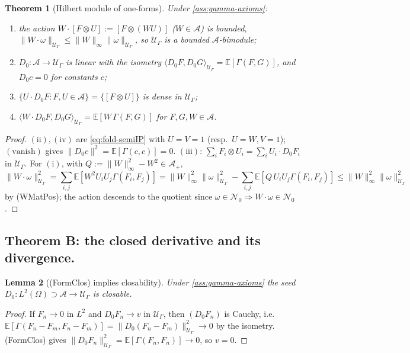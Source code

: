 \documentclass[reqno,final,11pt]{amsart}
\theoremstyle{plain}
\newtheorem{theorem}{Theorem}[section]
\newtheorem{lemma}[theorem]{Lemma}
\theoremstyle{definition}
\theoremstyle{remark}
\newcommand{\E}{\mathbb E}
\newcommand{\cA}{\mathcal A}
\newcommand{\cU}{\mathcal U}
\begin{document}
\begin{theorem}[Hilbert module of one-forms]\label{thm:foldA}
Under \cref{ass:gamma-axioms}:
\begin{enumerate}
\item[$(\mathrm i)$] the action $W\cdot[F\otimes U]:=[F\otimes(WU)]$ ($W\in\cA$)
is bounded, $\|W\cdot\omega\|_{\cU_\Gamma}\le\|W\|_\infty\|\omega\|_{\cU_\Gamma}$,
so $\cU_\Gamma$ is a bounded $\cA$-bimodule;
\item[$(\mathrm{ii})$] $D_0\colon\cA\to\cU_\Gamma$ is linear with the isometry
$\langle D_0F,D_0G\rangle_{\cU_\Gamma}=\E[\Gamma(F,G)]$, and $D_0c=0$ for
constants $c$;
\item[$(\mathrm{iii})$] $\{U\cdot D_0F:F,U\in\cA\}=\{[F\otimes U]\}$ is dense in
$\cU_\Gamma$;
\item[$(\mathrm{iv})$] $\langle W\cdot D_0F,D_0G\rangle_{\cU_\Gamma}
=\E[W\,\Gamma(F,G)]$ for $F,G,W\in\cA$.
\end{enumerate}
\end{theorem}
\begin{proof}
$(\mathrm{ii}),(\mathrm{iv})$ are \eqref{eq:fold-semiIP} with $U=V=1$
(resp.\ $U=W,V=1$); $(\mathrm{vanish})$ gives $\|D_0c\|^2=\E[\Gamma(c,c)]=0$.
$(\mathrm{iii})$: $\sum_iF_i\otimes U_i=\sum_iU_i\cdot D_0F_i$ in $\cU_\Gamma$.
For $(\mathrm i)$, with $Q:=\|W\|_\infty^2-W^2\in\cA_+$,
\[
  \|W\cdot\omega\|^2_{\cU_\Gamma}
  =\sum_{i,j}\E[W^2U_iU_j\Gamma(F_i,F_j)]
  =\|W\|_\infty^2\|\omega\|^2_{\cU_\Gamma}-\sum_{i,j}\E[Q\,U_iU_j\Gamma(F_i,F_j)]
  \le\|W\|_\infty^2\|\omega\|^2_{\cU_\Gamma}
\]
by \textnormal{(WMatPos)}; the action descends to the quotient since
$\omega\in\mathcal N_0\Rightarrow W\cdot\omega\in\mathcal N_0$.
\end{proof}

\subsection*{Theorem B: the closed derivative and its divergence.}
\begin{lemma}[\textnormal{(FormClos)} implies closability]\label{lem:foldclos}
Under \cref{ass:gamma-axioms} the seed $D_0\colon L^2(\Omega)\supset\cA\to\cU_\Gamma$
is closable.
\end{lemma}
\begin{proof}
If $F_n\to0$ in $L^2$ and $D_0F_n\to v$ in $\cU_\Gamma$, then $(D_0F_n)$ is
Cauchy, i.e.\ $\E[\Gamma(F_n-F_m,F_n-F_m)]=\|D_0(F_n-F_m)\|^2_{\cU_\Gamma}\to0$
by the isometry. \textnormal{(FormClos)} gives
$\|D_0F_n\|^2_{\cU_\Gamma}=\E[\Gamma(F_n,F_n)]\to0$, so $v=0$.
\end{proof}
\end{document}
